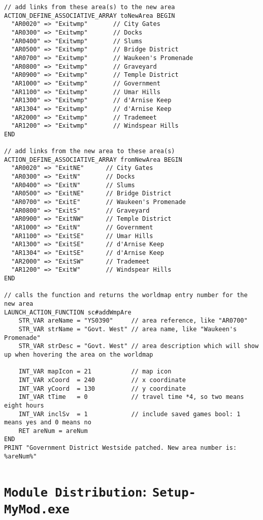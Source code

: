 \documentclass{article}
\def\DEFINE#1{{\tt \bf #1}\label{#1}\index{#1}}
\def\t#1{{\tt #1}}
\begin{document}
\begin{verbatim}
// add links from these area(s) to the new area
ACTION_DEFINE_ASSOCIATIVE_ARRAY toNewArea BEGIN
  "AR0020" => "Exitwmp"       // City Gates
  "AR0300" => "Exitwmp"       // Docks
  "AR0400" => "Exitwmp"       // Slums
  "AR0500" => "Exitwmp"       // Bridge District
  "AR0700" => "Exitwmp"       // Waukeen's Promenade
  "AR0800" => "Exitwmp"       // Graveyard
  "AR0900" => "Exitwmp"       // Temple District
  "AR1000" => "Exitwmp"       // Government
  "AR1100" => "Exitwmp"       // Umar Hills
  "AR1300" => "Exitwmp"       // d'Arnise Keep
  "AR1304" => "Exitwmp"       // d'Arnise Keep
  "AR2000" => "Exitwmp"       // Trademeet
  "AR1200" => "Exitwmp"       // Windspear Hills
END

// add links from the new area to these area(s)
ACTION_DEFINE_ASSOCIATIVE_ARRAY fromNewArea BEGIN
  "AR0020" => "ExitNE"      // City Gates
  "AR0300" => "ExitN"       // Docks
  "AR0400" => "ExitN"       // Slums
  "AR0500" => "ExitNE"      // Bridge District
  "AR0700" => "ExitE"       // Waukeen's Promenade
  "AR0800" => "ExitS"       // Graveyard
  "AR0900" => "ExitNW"      // Temple District
  "AR1000" => "ExitN"       // Government
  "AR1100" => "ExitSE"      // Umar Hills
  "AR1300" => "ExitSE"      // d'Arnise Keep
  "AR1304" => "ExitSE"      // d'Arnise Keep
  "AR2000" => "ExitSW"      // Trademeet
  "AR1200" => "ExitW"       // Windspear Hills
END

// calls the function and returns the worldmap entry number for the new area
LAUNCH_ACTION_FUNCTION sc#addWmpAre
    STR_VAR areName = "YS0390"     // area reference, like "AR0700"
    STR_VAR strName = "Govt. West" // area name, like "Waukeen's Promenade"
    STR_VAR strDesc = "Govt. West" // area description which will show up when hovering the area on the worldmap

    INT_VAR mapIcon = 21           // map icon
    INT_VAR xCoord  = 240          // x coordinate
    INT_VAR yCoord  = 130          // y coordinate
    INT_VAR tTime   = 0            // travel time *4, so two means eight hours
    INT_VAR inclSv  = 1            // include saved games bool: 1 means yes and 0 means no
    RET areNum = areNum
END
PRINT "Government District Westside patched. New area number is: %areNum%"
\end{verbatim}

\section{\DEFINE{Module Distribution}: \t{Setup-MyMod.exe}}
\end{document}

